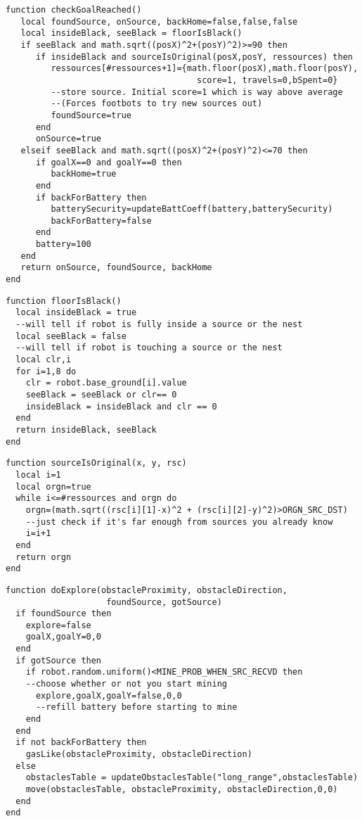 \begin{subappendices}
\begin{lstlisting}[caption=fonction checkGoalReached]
function checkGoalReached()
   local foundSource, onSource, backHome=false,false,false
   local insideBlack, seeBlack = floorIsBlack()
   if seeBlack and math.sqrt((posX)^2+(posY)^2)>=90 then
      if insideBlack and sourceIsOriginal(posX,posY, ressources) then
         ressources[#ressources+1]={math.floor(posX),math.floor(posY),
                                      score=1, travels=0,bSpent=0}
         --store source. Initial score=1 which is way above average
         --(Forces footbots to try new sources out)
         foundSource=true
      end
      onSource=true
   elseif seeBlack and math.sqrt((posX)^2+(posY)^2)<=70 then
      if goalX==0 and goalY==0 then
         backHome=true
      end
      if backForBattery then
         batterySecurity=updateBattCoeff(battery,batterySecurity)
         backForBattery=false
      end
      battery=100
   end
   return onSource, foundSource, backHome
end
\end{lstlisting}

\begin{lstlisting}[caption=Détection de la couleur du sol]
function floorIsBlack()
  local insideBlack = true
  --will tell if robot is fully inside a source or the nest
  local seeBlack = false
  --will tell if robot is touching a source or the nest
  local clr,i
  for i=1,8 do
    clr = robot.base_ground[i].value
    seeBlack = seeBlack or clr== 0
    insideBlack = insideBlack and clr == 0
  end
  return insideBlack, seeBlack
end
\end{lstlisting}


\begin{lstlisting}[caption=Vérifier l'originalité de la source]
function sourceIsOriginal(x, y, rsc)
  local i=1
  local orgn=true
  while i<=#ressources and orgn do
    orgn=(math.sqrt((rsc[i][1]-x)^2 + (rsc[i][2]-y)^2)>ORGN_SRC_DST)
    --just check if it's far enough from sources you already know
    i=i+1
  end
  return orgn
end
\end{lstlisting}


\begin{lstlisting}[caption=fonction doExplore]
function doExplore(obstacleProximity, obstacleDirection,
                    foundSource, gotSource)
  if foundSource then
    explore=false
    goalX,goalY=0,0
  end
  if gotSource then
    if robot.random.uniform()<MINE_PROB_WHEN_SRC_RECVD then
    --choose whether or not you start mining
      explore,goalX,goalY=false,0,0
      --refill battery before starting to mine
    end
  end
  if not backForBattery then
    gasLike(obstacleProximity, obstacleDirection)
  else
    obstaclesTable = updateObstaclesTable("long_range",obstaclesTable)
    move(obstaclesTable, obstacleProximity, obstacleDirection,0,0)
  end
end
\end{lstlisting}



\end{subappendices}

